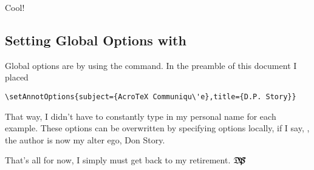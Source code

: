 \documentclass[12pt]{article}
\makeatletter
\def\darg#1{\texttt{\{#1\}}}
\def\dps{$\hbox{$\mathfrak D$\kern-.3em\hbox{$\mathfrak P$}%
   \kern-.6em \hbox{$\mathcal S$}}$}
\renewenvironment{quote}[1][]
   {\def\@rgi{#1}\ifx\@rgi\@empty
    \let\rghtm\@empty\else\def\rghtm{\rightmargin\leftmargin}\fi
    \list{}{\rghtm} %
    \item\relax}
   {\endlist}
\makeatother
\begin{document}
\begin{textboxpara}
\end{textboxpara}
\begin{quote}%
{}
%
\annotpro[margin,readonly,margintext={\centering The Code}]{\annotextboxi}%
\end{quote}
Cool!


\subsection{Setting Global Options with
    \texorpdfstring{\protect{}}{}}

Global options are by using the  command.
In the preamble of this document I placed
\begin{Verbatim}[fontsize=\footnotesize]
\setAnnotOptions{subject={AcroTeX Communiqu\'e},title={D.P. Story}}
\end{Verbatim}
That way, I didn't have to constantly type in my personal name for each example. These options can be overwritten
by specifying options locally, if I say, \cs{annotpro[author=Don Story]\darg{Hi there!}}, the author is now my
alter ego, Don Story.



\bigskip
\noindent
That's all for now, I simply must get back to my retirement. \dps\space{}
\end{document}

